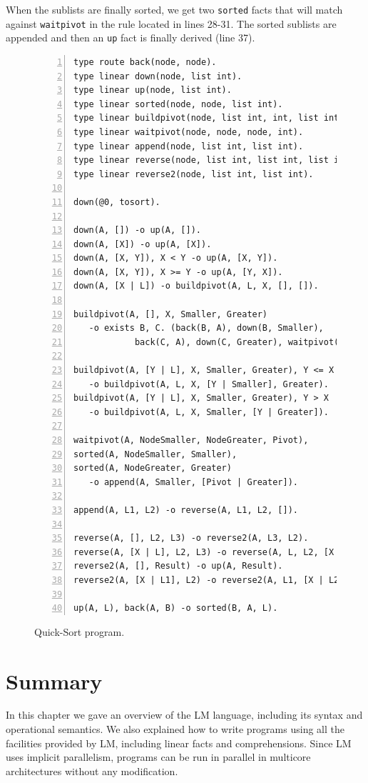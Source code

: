 When the sublists are finally sorted, we get two \texttt{sorted} facts that will match
against \texttt{waitpivot} in the rule located in lines 28-31. The sorted sublists
are appended and then an \texttt{up} fact is finally derived (line 37).

\begin{figure}[h!]
\small\begin{Verbatim}[numbers=left]
type route back(node, node).
type linear down(node, list int).
type linear up(node, list int).
type linear sorted(node, node, list int).
type linear buildpivot(node, list int, int, list int, list int).
type linear waitpivot(node, node, node, int).
type linear append(node, list int, list int).
type linear reverse(node, list int, list int, list int).
type linear reverse2(node, list int, list int).

down(@0, tosort).

down(A, []) -o up(A, []).
down(A, [X]) -o up(A, [X]).
down(A, [X, Y]), X < Y -o up(A, [X, Y]).
down(A, [X, Y]), X >= Y -o up(A, [Y, X]).
down(A, [X | L]) -o buildpivot(A, L, X, [], []).

buildpivot(A, [], X, Smaller, Greater)
   -o exists B, C. (back(B, A), down(B, Smaller),
            back(C, A), down(C, Greater), waitpivot(A, B, C, X)).

buildpivot(A, [Y | L], X, Smaller, Greater), Y <= X
   -o buildpivot(A, L, X, [Y | Smaller], Greater).
buildpivot(A, [Y | L], X, Smaller, Greater), Y > X
   -o buildpivot(A, L, X, Smaller, [Y | Greater]).
   
waitpivot(A, NodeSmaller, NodeGreater, Pivot),
sorted(A, NodeSmaller, Smaller),
sorted(A, NodeGreater, Greater)
   -o append(A, Smaller, [Pivot | Greater]).

append(A, L1, L2) -o reverse(A, L1, L2, []).

reverse(A, [], L2, L3) -o reverse2(A, L3, L2).
reverse(A, [X | L], L2, L3) -o reverse(A, L, L2, [X | L3]).
reverse2(A, [], Result) -o up(A, Result).
reverse2(A, [X | L1], L2) -o reverse2(A, L1, [X | L2]).

up(A, L), back(A, B) -o sorted(B, A, L).
\end{Verbatim}
  \caption{Quick-Sort program.}
  \label{code:quicksort}
\end{figure}
\normalsize


\section{Summary}

In this chapter we gave an overview of the LM language, including its syntax and operational semantics.
We also explained how to write programs using all the facilities provided by LM, including
linear facts and comprehensions. Since LM uses implicit parallelism, programs can be run in parallel
in multicore architectures without any modification.
